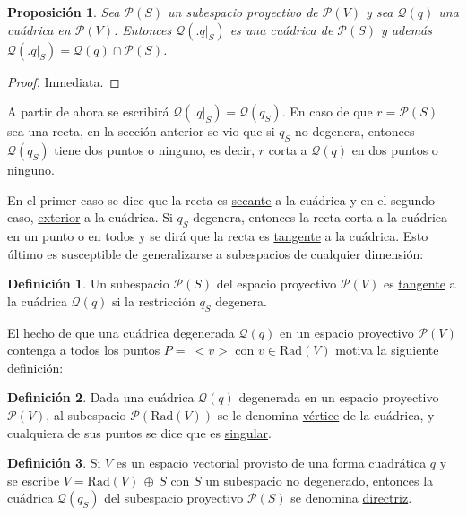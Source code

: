 \documentclass[12pt]{report}
\newtheorem{proposition}{Proposición}[chapter]
\theoremstyle{definition}
\newtheorem{definition}{Definición}[chapter]
\theoremstyle{definition}
\theoremstyle{remark}
\begin{document}
\begin{proposition}
    Sea $\mathcal{P}(S)$ un subespacio proyectivo de $\mathcal{P}(V)$ y sea $\mathcal{Q}(q)$ una cuádrica en $\mathcal{P}(V)$. Entonces $\mathcal{Q}(\bigl.q\bigr|_S)$ es una cuádrica de $\mathcal{P}(S)$ y además $\mathcal{Q}(\bigl.q\bigr|_S) = \mathcal{Q}(q) \cap \mathcal{P}(S)$.
\end{proposition}
\begin{proof}
Inmediata.
\end{proof}

A partir de ahora se escribirá $\mathcal{Q}(\bigl.q\bigr|_S) = \mathcal{Q}(q_S)$. En caso de que $r = \mathcal{P}(S)$ sea una recta, en la sección anterior se vio que si $q_S$ no degenera, entonces $\mathcal{Q}(q_S)$ tiene dos puntos o ninguno, es decir, $r$ corta a $\mathcal{Q}(q)$ en dos puntos o ninguno. 

\vspace{2mm}
En el primer caso se dice que la recta es \ul{secante} a la cuádrica y en el segundo caso, \ul{exterior} a la cuádrica. Si $q_S$ degenera, entonces la recta corta a la cuádrica en un punto o en todos y se dirá que la recta es \ul{tangente} a la cuádrica. Esto último es susceptible de generalizarse a subespacios de cualquier dimensión:

\begin{definition}
 Un subespacio $\mathcal{P}(S)$ del espacio proyectivo $\mathcal{P}(V)$ es \ul{tangente} a la cuádrica $\mathcal{Q}(q)$ si la restricción $q_S$ degenera.
\end{definition}

El hecho de que una cuádrica degenerada $\mathcal{Q}(q)$ en un espacio proyectivo $\mathcal{P}(V)$ contenga a todos los puntos $P = \ <v>$ con $v \in \textrm{Rad}(V)$ motiva la siguiente definición:

\begin{definition}
\label{def5.4.}
Dada una cuádrica $\mathcal{Q}(q)$ degenerada en un espacio proyectivo $\mathcal{P}(V)$, al subespacio $\mathcal{P}(\textrm{Rad}(V))$ se le denomina \ul{vértice} de la cuádrica, y cualquiera de sus puntos se dice que es \ul{singular}.
\end{definition}

\begin{definition}
Si $V$ es un espacio vectorial provisto de una forma cuadrática $q$ y se escribe $V = \textrm{Rad}(V) \, \oplus \, S$ con $S$ un subespacio no degenerado, entonces la cuádrica $\mathcal{Q}(q_S)$ del subespacio proyectivo $\mathcal{P}(S)$ se denomina \ul{directriz}.
\end{definition}
\end{document}
